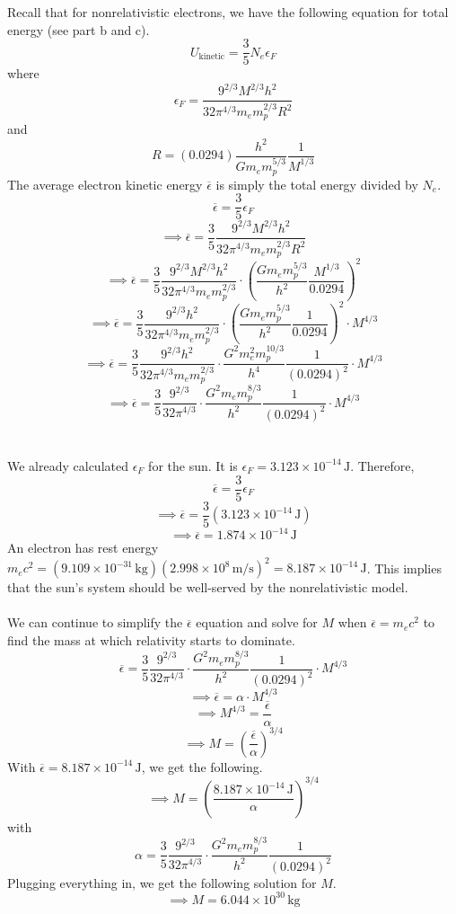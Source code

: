 \documentclass[12pt]{article}
\newcommand{\electronMass}{9.109\times10^{-31}\,\text{kg}}
\begin{document}
\begin{flushleft}
Recall that for nonrelativistic electrons, we have the following equation for total energy (see part b and c).
$$U_\text{kinetic}=\frac{3}{5}N_e\epsilon_F$$
where
$$\epsilon_F=\frac{9^{2/3}M^{2/3}h^2}{32\pi^{4/3}m_em_p^{2/3}R^2}$$
and
$$R=(0.0294)\frac{h^2}{Gm_em_p^{5/3}}\frac{1}{M^{1/3}}$$
The average electron kinetic energy $\overline{\epsilon}$ is simply the total energy divided by $N_e$.
$$\overline{\epsilon}=\frac{3}{5}\epsilon_F$$
$$\implies\overline{\epsilon}=\frac{3}{5}\frac{9^{2/3}M^{2/3}h^2}{32\pi^{4/3}m_em_p^{2/3}R^2}$$
$$\implies\overline{\epsilon}=\frac{3}{5}\frac{9^{2/3}M^{2/3}h^2}{32\pi^{4/3}m_em_p^{2/3}}\cdot\left(\frac{Gm_em_p^{5/3}}{h^2}\frac{M^{1/3}}{0.0294}\right)^2$$
$$\implies\overline{\epsilon}=\frac{3}{5}\frac{9^{2/3}h^2}{32\pi^{4/3}m_em_p^{2/3}}\cdot\left(\frac{Gm_em_p^{5/3}}{h^2}\frac{1}{0.0294}\right)^2\cdot M^{4/3}$$
$$\implies\overline{\epsilon}=\frac{3}{5}\frac{9^{2/3}h^2}{32\pi^{4/3}m_em_p^{2/3}}\cdot\frac{G^2m_e^2m_p^{10/3}}{h^4}\frac{1}{(0.0294)^2}\cdot M^{4/3}$$
$$\implies\overline{\epsilon}=\frac{3}{5}\frac{9^{2/3}}{32\pi^{4/3}}\cdot\frac{G^2m_em_p^{8/3}}{h^2}\frac{1}{(0.0294)^2}\cdot M^{4/3}$$\\~\\

We already calculated $\epsilon_F$ for the sun.
It is $\epsilon_F=3.123\times10^{-14}\,\text{J}$.
Therefore,
$$\overline{\epsilon}=\frac{3}{5}\epsilon_F$$
$$\implies\overline{\epsilon}=\frac{3}{5}(3.123\times10^{-14}\,\text{J})$$
$$\implies\overline{\epsilon}=1.874\times10^{-14}\,\text{J}$$
An electron has rest energy $m_ec^2=(\electronMass)(2.998\times10^8\,\text{m/s})^2=8.187\times10^{-14}\,\text{J}$.
This implies that the sun's system should be well-served by the nonrelativistic model.\\~\\

We can continue to simplify the $\overline{\epsilon}$ equation and solve for $M$ when $\overline{\epsilon}=m_ec^2$ to find the mass at which relativity starts to dominate.
$$\overline{\epsilon}=\frac{3}{5}\frac{9^{2/3}}{32\pi^{4/3}}\cdot\frac{G^2m_em_p^{8/3}}{h^2}\frac{1}{(0.0294)^2}\cdot M^{4/3}$$
$$\implies\overline{\epsilon}=\alpha\cdot M^{4/3}$$
$$\implies M^{4/3}=\frac{\overline{\epsilon}}{\alpha}$$
$$\implies M=\left(\frac{\overline{\epsilon}}{\alpha}\right)^{3/4}$$
With $\overline{\epsilon}=8.187\times10^{-14}\,\text{J}$, we get the following.
$$\implies M=\left(\frac{8.187\times10^{-14}\,\text{J}}{\alpha}\right)^{3/4}$$
with
$$\alpha=\frac{3}{5}\frac{9^{2/3}}{32\pi^{4/3}}\cdot\frac{G^2m_em_p^{8/3}}{h^2}\frac{1}{(0.0294)^2}$$
Plugging everything in, we get the following solution for $M$.
$$\implies M=6.044\times10^{30}\,\text{kg}$$






\end{flushleft}
\end{document}
